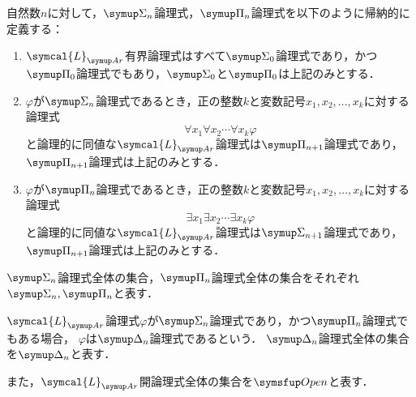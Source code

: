 \begin{Def}
	自然数\(n\)に対して，\(\SigmaFormula_n\)論理式，\(\PiFormula_n\)論理式を以下のように帰納的に定義する：
	\begin{enumerate}
		\item \(\symcal{L}_{\Ar}\)有界論理式はすべて\(\SigmaFormula_0\)論理式であり，かつ\(\PiFormula_0\)論理式でもあり，\(\SigmaFormula_0\)と\(\PiFormula_0\)は上記のみとする．
		\item \(\varphi\)が\(\SigmaFormula_n\)論理式であるとき，正の整数\(k\)と変数記号\(x_1, x_2, \dots, x_k\)に対する論理式
		      \[
			      \forall x_1 \forall x_2 \dotsb \forall x_k \varphi
		      \]
		      と論理的に同値な\(\symcal{L}_{\Ar}\)論理式は\(\PiFormula_{n+1}\)論理式であり，\(\PiFormula_{n+1}\)論理式は上記のみとする．
		\item \(\varphi\)が\(\PiFormula_n\)論理式であるとき，正の整数\(k\)と変数記号\(x_1, x_2, \dots, x_k\)に対する論理式
		      \[
			      \exists x_1 \exists x_2 \dotsb \exists x_k \varphi
		      \]
		      と論理的に同値な\(\symcal{L}_{\Ar}\)論理式は\(\SigmaFormula_{n+1}\)論理式であり，\(\PiFormula_{n+1}\)論理式は上記のみとする．
	\end{enumerate}
	\(\SigmaFormula_n\)論理式全体の集合，\(\PiFormula_n\)論理式全体の集合をそれぞれ\(\SigmaFormula_n, \PiFormula_n\)と表す．

	\(\symcal{L}_{\Ar}\)論理式\(\varphi\)が\(\SigmaFormula_n\)論理式であり，かつ\(\PiFormula_n\)論理式でもある場合，
	\(\varphi\)は\(\DeltaFormula_n\)論理式であるという．
	\(\DeltaFormula_n\)論理式全体の集合を\(\DeltaFormula_n\)と表す．

	また，\(\symcal{L}_{\Ar}\)開論理式全体の集合を\(\OpenFormulaSet\)と表す．
\end{Def}


